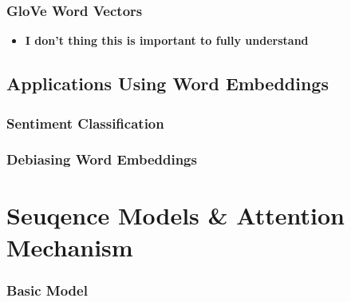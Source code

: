 \documentclass[12pt,a4paper]{report}
\begin{document}
		\subsection{GloVe Word Vectors}
			\begin{itemize}
			\item \textbf{I don't thing this is important to fully understand}
			\end{itemize}
	\section{Applications Using Word Embeddings}
		\subsection{Sentiment Classification}
		\subsection{Debiasing Word Embeddings}
\chapter{Seuqence Models \& Attention Mechanism}
	\subsection{Basic Model}
\end{document}
